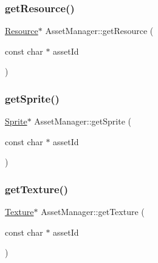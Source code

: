 \mbox{\label{class_asset_manager_a96faef50e65cf928e3eecc3ee7af287c}} 
\subsubsection{\texorpdfstring{get\+Resource()}{getResource()}}
{\footnotesize\ttfamily \hyperlink{class_resource}{Resource}$\ast$ Asset\+Manager\+::get\+Resource (\begin{DoxyParamCaption}\item[{const char $\ast$}]{asset\+Id }\end{DoxyParamCaption})\hspace{0.3cm}{\ttfamily [inline]}}

\mbox{\label{class_asset_manager_a3b3c93317e49e9bd0a9f13e25b3704b7}} 
\subsubsection{\texorpdfstring{get\+Sprite()}{getSprite()}}
{\footnotesize\ttfamily \hyperlink{class_sprite}{Sprite}$\ast$ Asset\+Manager\+::get\+Sprite (\begin{DoxyParamCaption}\item[{const char $\ast$}]{asset\+Id }\end{DoxyParamCaption})\hspace{0.3cm}{\ttfamily [inline]}}

\mbox{\label{class_asset_manager_ae6a8e90c1afdc608efea5e633a6da1a5}} 
\subsubsection{\texorpdfstring{get\+Texture()}{getTexture()}}
{\footnotesize\ttfamily \hyperlink{class_texture}{Texture}$\ast$ Asset\+Manager\+::get\+Texture (\begin{DoxyParamCaption}\item[{const char $\ast$}]{asset\+Id }\end{DoxyParamCaption})\hspace{0.3cm}{\ttfamily [inline]}}

